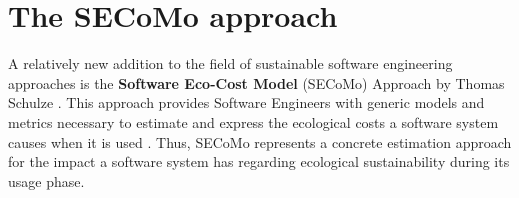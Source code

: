 \documentclass[oribibl]{llncs}
\begin{document}
\section{The SECoMo approach} %
A relatively new addition to the field of sustainable software engineering approaches %
is the %
\textbf{Software Eco-Cost Model} %
(SECoMo) Approach by Thomas Schulze %
\cite{schulze_cost_2016}. This approach provides %
Software Engineers with generic models and metrics necessary to estimate and express the ecological costs %
a software system causes when it is used \cite{schulze_cost_2016}. Thus, SECoMo represents a concrete estimation approach for the impact a software system has regarding ecological sustainability during its usage phase. 
\end{document}
